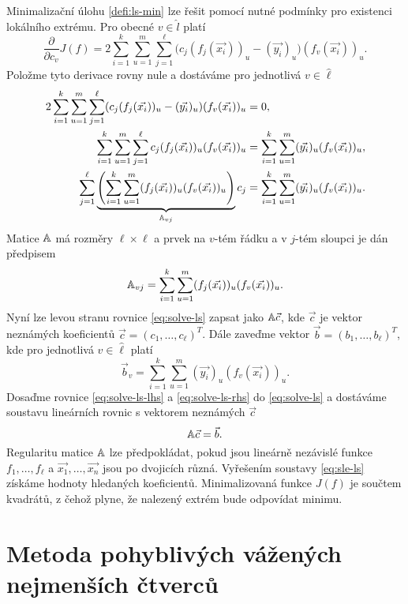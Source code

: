 Minimalizační úlohu \eqref{defi:ls-min} lze řešit pomocí nutné podmínky pro existenci lokálního extrému. Pro obecné $v \in \hat l$ platí
\[
  \frac{\partial}{\partial c_v}J(f) = 2\sum_{i=1}^k\sum_{u=1}^m\sum_{j=1}^\ell\big(c_j(f_j(\vec{x_i}))_u - (\vec{y_i})_u\big)(f_v(\vec{x_i}))_u.
\]
Položme tyto derivace rovny nule a dostáváme pro jednotlivá $v \in \hat \ell$
\begin{align}
\label{eq:solve-ls}
2\sum_{i=1}^k\sum_{u=1}^m\sum_{j=1}^\ell (c_j(f_j(\vec{x_i}))_u - (\vec{y_i})_u)(f_v(\vec{x_i}))_u &= 0,\notag\\
\sum_{i=1}^k\sum_{u=1}^m\sum_{j=1}^\ell c_j(f_j(\vec{x_i}))_u (f_v(\vec{x_i}))_u &= \sum_{i=1}^k\sum_{u=1}^m(\vec{y_i})_u(f_v(\vec{x_i}))_u,\notag\\
\sum_{j=1}^\ell\underbrace{\left(\sum_{i=1}^k\sum_{u=1}^m(f_j(\vec{x_i}))_u (f_v(\vec{x_i}))_u\right)}_{\mathbb{A}_{vj}}c_j &= \sum_{i=1}^k\sum_{u=1}^m(\vec{y_i})_u(f_v(\vec{x_i}))_u.
\end{align}
Matice $\mathbb{A}$ má rozměry $\ell \times \ell$ a prvek na $v$-tém řádku a v $j$-tém sloupci je dán předpisem
\begin{equation}
\label{eq:solve-ls-lhs}
  \mathbb{A}_{vj} = \sum_{i=1}^k\sum_{u=1}^m (f_j(\vec{x_i}))_u(f_v(\vec{x_i}))_u.
\end{equation}
Nyní lze levou stranu rovnice \eqref{eq:solve-ls} zapsat jako $\mathbb{A}\vec{c}$, kde $\vec{c}$ je vektor neznámých koeficientů $\vec{c} = (c_1, \ldots, c_\ell)^T$. Dále zaveďme vektor $\vec{b} = (b_1,\ldots,b_\ell)^T$, kde pro jednotlivá $v \in \hat \ell$ platí
\begin{equation}
\label{eq:solve-ls-rhs}
  \vec{b}_v = \sum_{i=1}^k\sum_{u=1}^m (\vec{y_i})_u (f_v(\vec{x_i}))_u.
\end{equation}
Dosaďme rovnice \eqref{eq:solve-ls-lhs} a \eqref{eq:solve-ls-rhs} do \eqref{eq:solve-ls} a dostáváme soustavu lineárních rovnic s vektorem neznámých $\vec{c}$
\begin{equation}
  \label{eq:sle-ls}
  \mathbb{A}\vec{c} = \vec{b}.
\end{equation}
Regularitu matice $\mathbb{A}$ lze předpokládat, pokud jsou lineárně nezávislé funkce $f_1, \ldots, f_\ell$ a $\vec{x_1}, \ldots, \vec{x_n}$ jsou po dvojicích různá. Vyřešením soustavy \eqref{eq:sle-ls} získáme hodnoty hledaných koeficientů. Minimalizovaná funkce $J(f)$ je součtem kvadrátů, z čehož plyne, že nalezený extrém bude odpovídat minimu.

\section{Metoda pohyblivých vážených nejmenších čtverců}
\label{sec:mwls}

